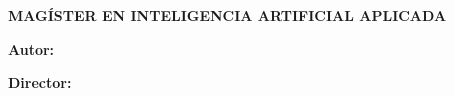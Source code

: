 \begin{titlepage}
  \vspace{1cm}

  {\fontsize{16}{19.2}\bfseries\MakeUppercase{Magíster en Inteligencia Artificial Aplicada}}

  \vspace{1cm}

  \raggedright
  {\fontsize{12}{24}\selectfont\bfseries Autor:}
  {\fontsize{12}{24}\selectfont \UTPLauthor}

  {\fontsize{12}{24}\selectfont\bfseries Director:}
  {\fontsize{12}{24}\selectfont \UTPLadvisor}

  \centering

  \vfill

  {\fontsize{12}{14.4}\MakeUppercase{\UTPLcity}\par}
  {\fontsize{12}{14.4}\UTPLyear}
\end{titlepage}
